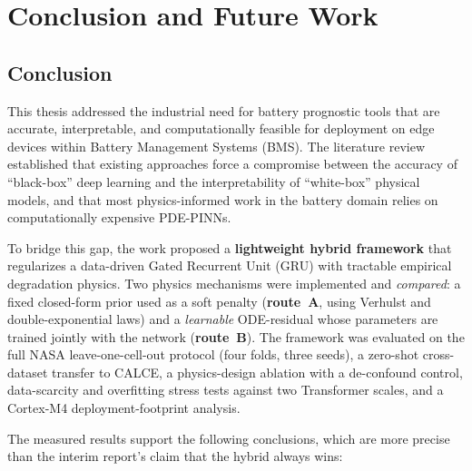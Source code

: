 \chapter{Conclusion and Future Work}
\label{ch:conclusion}

\section{Conclusion}

This thesis addressed the industrial need for battery prognostic tools that are
accurate, interpretable, and computationally feasible for deployment on edge
devices within Battery Management Systems (BMS). The literature review established
that existing approaches force a compromise between the accuracy of ``black-box''
deep learning and the interpretability of ``white-box'' physical models, and that
most physics-informed work in the battery domain relies on computationally
expensive PDE-PINNs.

To bridge this gap, the work proposed a \textbf{lightweight hybrid framework} that
regularizes a data-driven Gated Recurrent Unit (GRU) with tractable empirical
degradation physics. Two physics mechanisms were implemented and \emph{compared}: a
fixed closed-form prior used as a soft penalty (\textbf{route~A}, using Verhulst
and double-exponential laws) and a \emph{learnable} ODE-residual whose parameters
are trained jointly with the network (\textbf{route~B}). The framework was
evaluated on the full NASA leave-one-cell-out protocol (four folds, three
seeds), a zero-shot cross-dataset transfer to CALCE, a physics-design ablation
with a de-confound control, data-scarcity and overfitting stress tests against
two Transformer scales, and a Cortex-M4 deployment-footprint analysis.

The measured results support the following conclusions, which are more precise
than the interim report's claim that the hybrid always wins:

